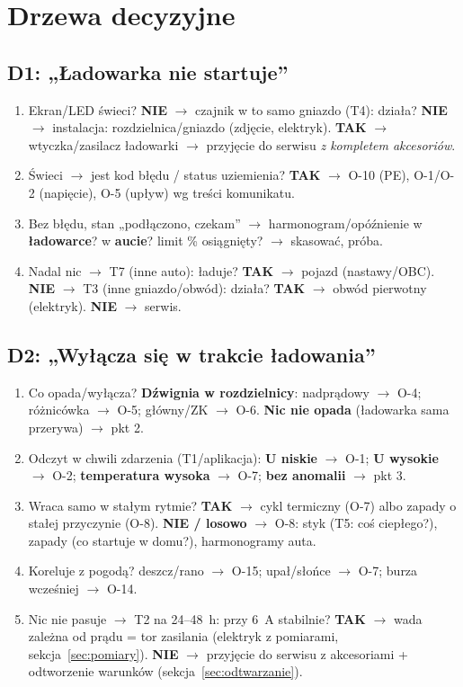 \documentclass[11pt]{article}
\newcommand{\key}[1]{\textbf{\color{navy}#1}}
\begin{document}
\section{Drzewa decyzyjne}\label{sec:drzewa}
\subsection{D1: „Ładowarka nie startuje''}
\begin{enumerate}
\item Ekran/LED świeci? \key{NIE} $\rightarrow$ czajnik w to samo gniazdo (T4): działa? \key{NIE} $\rightarrow$ instalacja: rozdzielnica/gniazdo (zdjęcie, elektryk). \key{TAK} $\rightarrow$ wtyczka/zasilacz ładowarki $\rightarrow$ przyjęcie do serwisu \emph{z kompletem akcesoriów}.
\item Świeci $\rightarrow$ jest kod błędu / status uziemienia? \key{TAK} $\rightarrow$ O-10 (PE), O-1/O-2 (napięcie), O-5 (upływ) wg treści komunikatu.
\item Bez błędu, stan „podłączono, czekam'' $\rightarrow$ harmonogram/opóźnienie w \key{ładowarce}? w \key{aucie}? limit \% osiągnięty? $\rightarrow$ skasować, próba.
\item Nadal nic $\rightarrow$ T7 (inne auto): ładuje? \key{TAK} $\rightarrow$ pojazd (nastawy/OBC). \key{NIE} $\rightarrow$ T3 (inne gniazdo/obwód): działa? \key{TAK} $\rightarrow$ obwód pierwotny (elektryk). \key{NIE} $\rightarrow$ serwis.
\end{enumerate}

\subsection{D2: „Wyłącza się w trakcie ładowania''}
\begin{enumerate}
\item Co opada/wyłącza? \key{Dźwignia w rozdzielnicy}: nadprądowy $\rightarrow$ O-4; różnicówka $\rightarrow$ O-5; główny/ZK $\rightarrow$ O-6. \key{Nic nie opada} (ładowarka sama przerywa) $\rightarrow$ pkt 2.
\item Odczyt w chwili zdarzenia (T1/aplikacja): \key{U niskie} $\rightarrow$ O-1; \key{U wysokie} $\rightarrow$ O-2; \key{temperatura wysoka} $\rightarrow$ O-7; \key{bez anomalii} $\rightarrow$ pkt 3.
\item Wraca samo w stałym rytmie? \key{TAK} $\rightarrow$ cykl termiczny (O-7) albo zapady o stałej przyczynie (O-8). \key{NIE / losowo} $\rightarrow$ O-8: styk (T5: coś ciepłego?), zapady (co startuje w domu?), harmonogramy auta.
\item Koreluje z pogodą? deszcz/rano $\rightarrow$ O-15; upał/słońce $\rightarrow$ O-7; burza wcześniej $\rightarrow$ O-14.
\item Nic nie pasuje $\rightarrow$ T2 na 24--48~h: przy 6~A stabilnie? \key{TAK} $\rightarrow$ wada zależna od prądu = tor zasilania (elektryk z pomiarami, sekcja~\ref{sec:pomiary}). \key{NIE} $\rightarrow$ przyjęcie do serwisu z akcesoriami + odtworzenie warunków (sekcja~\ref{sec:odtwarzanie}).
\end{enumerate}
\end{document}
